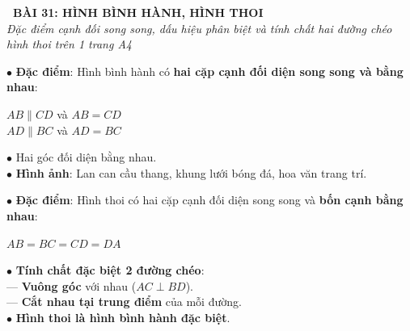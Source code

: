 \documentclass[14pt,a4paper,oneside]{extbook}
\begin{document}
\noindent
\begin{tcolorbox}[
  enhanced,
  colback=teal!8!white,
  colframe=teal!80!black,
  arc=3mm, boxrule=1pt,
  left=3mm, right=3mm, top=2mm, bottom=2mm,
  halign=center
]
  {\Large\bfseries\color{teal!90!black}\faBookmark\ BÀI 31: HÌNH BÌNH HÀNH, HÌNH THOI}\\[1.5pt]
  {\footnotesize\itshape\color{black!75} Đặc điểm cạnh đối song song, dấu hiệu phân biệt và tính chất hai đường chéo hình thoi trên 1 trang A4}
\end{tcolorbox}

\vspace{2mm}

\noindent
\begin{minipage}[t]{0.49\textwidth}
  \begin{tcolorbox}[
    enhanced,
    title={\footnotesize\bfseries\color{white}\faCube\ 1. Hình bình hành},
    colback=blue!2!white,
    colframe=blue!75!black,
    arc=2.5mm, boxrule=0.8pt, top=1.8mm, bottom=1.8mm, left=2mm, right=2mm
  ]
    \footnotesize
    $\bullet$ \textbf{Đặc điểm}: Hình bình hành có \textbf{hai cặp cạnh đối diện song song và bằng nhau}:
    \begin{center}
      $AB \parallel CD$ và $AB = CD$\\
      $AD \parallel BC$ và $AD = BC$
    \end{center}
    $\bullet$ Hai góc đối diện bằng nhau.\\
    $\bullet$ \textbf{Hình ảnh}: Lan can cầu thang, khung lưới bóng đá, hoa văn trang trí.
  \end{tcolorbox}
\end{minipage}%
\hfill
\begin{minipage}[t]{0.49\textwidth}
  \begin{tcolorbox}[
    enhanced,
    title={\footnotesize\bfseries\color{white}\faDiamond\ 2. Hình thoi},
    colback=teal!2!white,
    colframe=teal!75!black,
    arc=2.5mm, boxrule=0.8pt, top=1.8mm, bottom=1.8mm, left=2mm, right=2mm
  ]
    \footnotesize
    $\bullet$ \textbf{Đặc điểm}: Hình thoi có hai cặp cạnh đối diện song song và \textbf{bốn cạnh bằng nhau}:
    \begin{center}
      $AB = BC = CD = DA$
    \end{center}
    $\bullet$ \textbf{Tính chất đặc biệt 2 đường chéo}:\\
    --- \textbf{Vuông góc} với nhau ($AC \perp BD$).\\
    --- \textbf{Cắt nhau tại trung điểm} của mỗi đường.\\
    $\bullet$ \textbf{Hình thoi là hình bình hành đặc biệt}.
  \end{tcolorbox}
\end{minipage}
\end{document}
